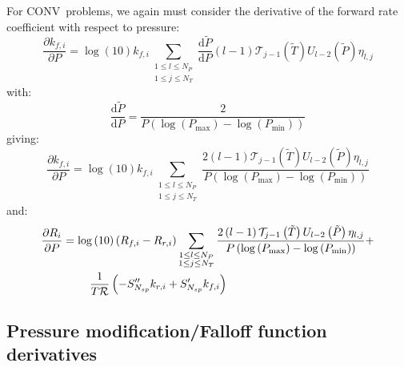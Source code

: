 \documentclass[12pt]{article}
\newcommand{\ns}{N_{sp}}
\newcommand{\conv}{CONV}
\newcommand{\Ru}{\mathcal{R}}
\begin{document}
For \conv~problems, we again must consider the derivative of the forward rate coefficient with respect to pressure:
\begin{equation}
 \frac{\partial {k_{f, i}} }{\partial P } = \log{\left (10 \right )} {k_{f, i}} \sum_{\substack{1 \leq l \leq N_{P}\\1 \leq j \leq N_{T}}} \frac{\text{d} \tilde{P} }{\text{d} P } \left(l - 1\right) \mathcal{T}_{j - 1}\left(\tilde{T}\right) U_{l - 2}\left(\tilde{P}\right) \eta_{l,j}
\end{equation}
with:
\begin{equation}
 \frac{\text{d} \tilde{P} }{\text{d} P } = \frac{2}{P \left(\log{\left (P_{\max} \right )} - \log{\left (P_{\min} \right )}\right)}
\end{equation}
giving:
\begin{equation}
 \frac{\partial {k_{f, i}} }{\partial P } = \log{\left (10 \right )} {k_{f, i}} \sum_{\substack{1 \leq l \leq N_{P}\\1 \leq j \leq N_{T}}} \frac{2 \left(l - 1\right) \mathcal{T}_{j - 1}\left(\tilde{T}\right) U_{l - 2}\left(\tilde{P}\right) \eta_{l,j}}{P \left(\log{\left (P_{\max} \right )} - \log{\left (P_{\min} \right )}\right)}
\end{equation}
and:
\begin{align}
 \frac{\partial R_{i} }{\partial P } &= \log{\left (10 \right )} \left({R_{f, i}} - {R_{r, i}}\right) \sum_{\substack{1 \leq l \leq N_{P}\\1 \leq j \leq N_{T}}} \frac{2 \left(l - 1\right) \mathcal{T}_{j - 1}\left(\tilde{T}\right) U_{l - 2}\left(\tilde{P}\right) \eta_{l,j}}{P \left(\log{\left (P_{\max} \right )} - \log{\left (P_{\min} \right )}\right)} + \nonumber \\
				     & \mathindent \frac{1}{T \Ru} \left(- S^{\prime\prime}_{\ns} {k_{r, i}} + S^{\prime}_{\ns} {k_{f, i}}\right)
\end{align}



\subsection{Pressure modification\slash Falloff function derivatives}
\label{s:dpmod_fall}
\end{document}
